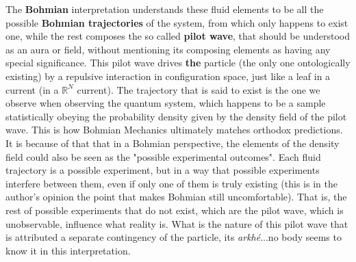 \documentclass[11pt, a4paper]{article} %
\newcommand{\R}{\mathbb{R}} %
\begin{document}
The {\bf Bohmian} interpretation understands these fluid elements to be all the possible {\bf Bohmian trajectories} of the system, from which only happens to exist one, while the rest composes the so called {\bf pilot wave}, that should be understood as an aura or field, without mentioning its composing elements as having any special significance. This pilot wave drives {\bf the} particle (the only one ontologically existing) by a repulsive interaction in configuration space, just like a leaf in a current (in a $\R^N$ current). The trajectory that is said to exist is the one we observe when observing the quantum system, which happens to be a sample statistically obeying the probability density given by the density field of the pilot wave. This is how Bohmian Mechanics ultimately matches orthodox predictions. It is because of that that in a Bohmian perspective, the elements of the density field could also be seen as the "possible experimental outcomes". Each fluid trajectory is a possible experiment, but in a way that possible experiments interfere between them, even if only one of them is truly existing (this is in the author's opinion the point that makes Bohmian still uncomfortable). That is, the rest of possible experiments that do not exist, which are the pilot wave, which is unobservable, influence what reality is. What is the nature of this pilot wave that is attributed a separate contingency of the particle, its {\em arkhé}...no body seems to know it in this interpretation.
\end{document}
